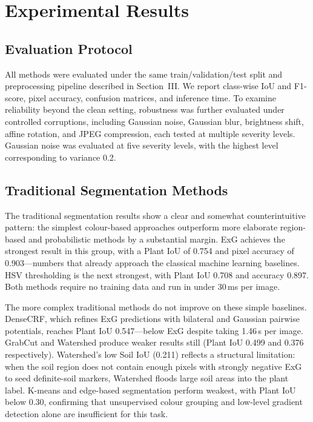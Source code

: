 \documentclass[conference]{IEEEtran}
\begin{document}
\section{Experimental Results}

\subsection{Evaluation Protocol}

All methods were evaluated under the same train/validation/test split
and preprocessing pipeline described in Section~III\@. We
report class-wise IoU and F1-score, pixel accuracy, confusion matrices,
and inference time. To examine reliability beyond the clean setting,
robustness was further evaluated under controlled corruptions, including
Gaussian noise, Gaussian blur, brightness shift, affine rotation, and
JPEG compression, each tested at multiple severity levels. Gaussian
noise was evaluated at five severity levels, with the highest level
corresponding to variance 0.2.

\subsection{Traditional Segmentation Methods}

The traditional segmentation results show a clear and somewhat
counterintuitive pattern: the simplest colour-based approaches
outperform more elaborate region-based and probabilistic methods by a
substantial margin. ExG achieves the strongest result in this group,
with a Plant IoU of 0.754 and pixel accuracy of 0.903---numbers that
already approach the classical machine learning baselines. HSV
thresholding is the next strongest, with Plant IoU 0.708 and accuracy
0.897. Both methods require no training data and run in under 30\,ms
per image.

The more complex traditional methods do not improve on these simple
baselines. DenseCRF, which refines ExG predictions with bilateral and
Gaussian pairwise potentials, reaches Plant IoU 0.547---below ExG
despite taking 1.46\,s per image. GrabCut and Watershed produce weaker
results still (Plant IoU 0.499 and 0.376 respectively). Watershed's
low Soil IoU (0.211) reflects a structural limitation: when the soil
region does not contain enough pixels with strongly negative ExG to
seed definite-soil markers, Watershed floods large soil areas into the
plant label. K-means and edge-based segmentation perform weakest,
with Plant IoU below 0.30, confirming that unsupervised colour grouping
and low-level gradient detection alone are insufficient for this task.
\end{document}
